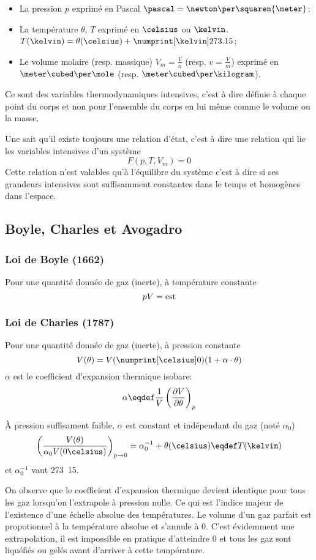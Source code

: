 \begin{itemize}
  \item
    La pression $p$ exprimé en Pascal $\pascal = \newton\per\squaren{\meter}$;
  \item
    La température $\theta$, $T$ exprimé en $\celsius$ ou $\kelvin$.
    $T(\kelvin) = \theta(\celsius) + \si{273.15}{\kelvin}$;
  \item
    Le volume molaire (resp. massique)
    $V_m = \frac{V}{n}$ (resp. $v = \frac{V}{m}$)
    exprimé en $\meter\cubed\per\mole$ (resp. $\meter\cubed\per\kilogram$).
\end{itemize}

Ce sont des variables thermodynamiques intensives,
c'est à dire définie à chaque point du corps et
non pour l'ensemble du corps en lui même comme le volume ou la masse.

Une sait qu'il existe toujours une relation d'état,
c'est à dire une relation
qui lie les variables intensives d'un système
\[ F(p, T, V_m) = 0 \]
Cette relation n'est valables qu'à l'équilibre du système
c'est à dire si ses grandeurs intensives sont suffisamment constantes
dans le temps et homogènes dans l'espace.

\subsection{Boyle, Charles et Avogadro}
\subsubsection{Loi de Boyle (1662)}
Pour une quantité donnée de gaz (inerte), à température constante
\[ pV = \mathrm{cst} \]

\subsubsection{Loi de Charles (1787)}
Pour une quantité donnée de gaz (inerte), à pression constante
\[ V(\theta) = V(\si{0}{\celsius})(1 + \alpha \cdot \theta) \]
$\alpha$ est le coefficient d'expansion thermique isobare:
\[ \alpha \eqdef
\frac{1}{V}\left(\fpart{V}{\theta}\right)_p \]

À pression suffisament faible,
$\alpha$ est constant et indépendant du gaz (noté $\alpha_0$)
\[ \left(\frac{V(\theta)}{\alpha_0 V(0\celsius)}\right)_{p\rightarrow 0} =
\alpha_0^{-1}+\theta(\celsius) \eqdef T(\kelvin) \]
et $\alpha_0^{-1}$ vaut \si{273.15}{\celsius}.

On observe que le coefficient d'expansion thermique devient identique
pour tous les gaz lorsqu'on l'extrapole à pression nulle.
Ce qui est l'indice majeur de l'existence
d'une échelle absolue des températures.
Le volume d'un gaz parfait est propotionnel à la température absolue et
s'annule à \si{0}{\kelvin}.
C'est évidemment une extrapolation, il est impossible en pratique d'atteindre
\si{0}{\kelvin} et tous les gaz sont liquéfiés ou
gelés avant d'arriver à cette température.

